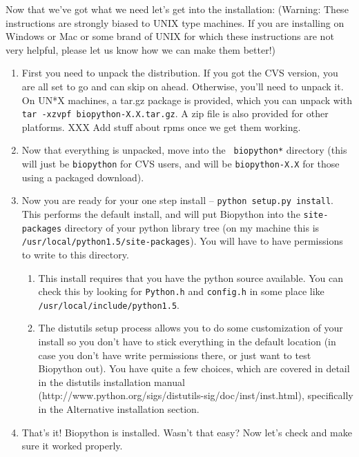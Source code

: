 \documentclass[dvips]{article}
\begin{document}
Now that we've got what we need let's get into the installation: (Warning: These instructions are strongly biased to UNIX type machines. If you are installing on Windows or Mac or some brand of UNIX for which these instructions are not very helpful, please let us know how we can make them better!)

\begin{enumerate}

\item First you need to unpack the distribution. If you got the CVS version, you are all set to go and can skip on ahead. Otherwise, you'll need to unpack it. On UN*X machines, a tar.gz package is provided, which you can unpack with \verb|tar -xzvpf biopython-X.X.tar.gz|. A zip file is also provided for other platforms. XXX Add stuff about rpms once we get them working.

\item Now that everything is unpacked, move into the \verb| biopython*| directory (this will just be \verb|biopython| for CVS users, and will be \verb|biopython-X.X| for those using a packaged download). 

\item Now you are ready for your one step install -- \verb|python setup.py install|. This performs the default install, and will put Biopython into the \verb|site-packages| directory of your python library tree (on my machine this is \verb|/usr/local/python1.5/site-packages|). You will have to have permissions to write to this directory. 

\begin{enumerate}

\item This install requires that you have the python source available. You can check this by looking for \verb|Python.h| and \verb|config.h| in some place like \verb|/usr/local/include/python1.5|.

\item The distutils setup process allows you to do some customization of your install so you don't have to stick everything in the default location (in case you don't have write permissions there, or just want to test Biopython out). You have quite a few choices, which are covered in detail in the distutils installation manual (http://www.python.org/sigs/distutils-sig/doc/inst/inst.html), specifically in the Alternative installation section.

\end{enumerate}

\item That's it! Biopython is installed. Wasn't that easy? Now let's check and make sure it worked properly.

\end{enumerate}
\end{document}
